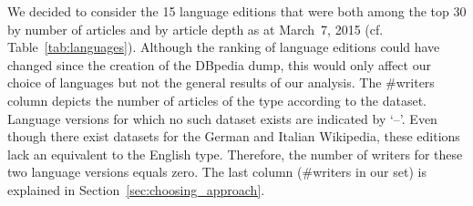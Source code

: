 \documentclass[a4paper,12pt]{scrartcl}
\begin{document}
We decided to consider the 15 language editions that were both among
the top 30 by number of articles and by article depth as at
March~7, 2015 (cf. Table~\ref{tab:languages}).
Although the ranking of language editions could
  have changed since the creation of the DBpedia dump, this would only
  affect our choice of languages but not the general results of our
  analysis.
%
The \#writers column depicts the number of articles of the type
 according to the  dataset.
Language versions for which no such dataset exists are indicated by
`--'.  Even though there exist  datasets for
the German and Italian Wikipedia, these editions lack an equivalent to
the English  type. Therefore, the number of writers for
these two language versions equals zero.
The last column (\#writers in our set) is explained in
Section~\ref{sec:choosing_approach}.
%
%

\end{document}
